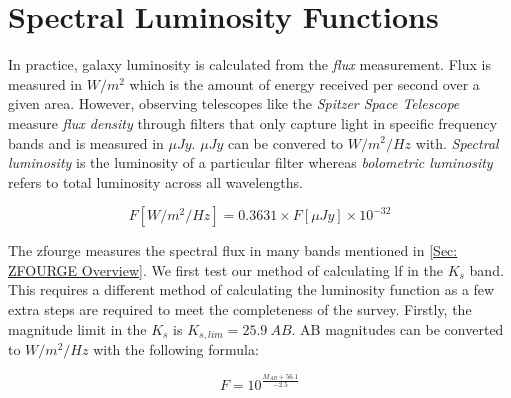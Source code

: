 \section{Spectral Luminosity Functions}

In practice, galaxy luminosity is calculated from the \textit{flux} measurement. Flux is measured in $W/m^2$ which is the amount of energy received per second over a given area. However, observing telescopes like the \textit{Spitzer Space Telescope} measure \textit{flux density} through filters that only capture light in specific frequency bands and is measured in $\mu Jy$. $\mu Jy$ can be convered to $W/m^2/Hz$ with. \textit{Spectral luminosity} is the luminosity of a particular filter whereas \textit{bolometric luminosity} refers to total luminosity across all wavelengths. 

\begin{equation}
    F [W/m^2/Hz] = 0.3631 \times F [\mu Jy] \times 10^{-32} 
    \label{EQ: }
\end{equation}

The \gls{zfourge} measures the spectral flux in many bands mentioned in \cref{Sec: ZFOURGE Overview}. We first test our method of calculating \gls{lf} in the $K_{s}$ band. This requires a different method of calculating the luminosity function as a few extra steps are required to meet the completeness of the survey. Firstly, the magnitude limit in the $K_{s}$ is $K_{s,lim} = 25.9\ AB$. AB magnitudes can be converted to $W/m^2/Hz$ with the following formula:

\begin{equation}
    F = 10^{\frac{M_{AB}+56.1}{-2.5}}
\end{equation}
